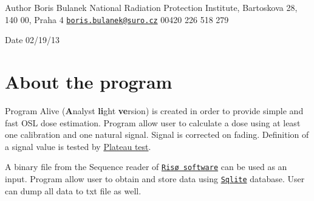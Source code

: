 \begin{DoxyAuthor}{Author}
Boris Bulanek  National Radiation Protection Institute, Bartoskova 28, 140 00, Praha 4  \href{mailto:boris.bulanek@suro.cz}{\tt boris.\-bulanek@suro.\-cz}  00420 226 518 279 
\end{DoxyAuthor}
\begin{DoxyDate}{Date}
02/19/13
\end{DoxyDate}
\hypertarget{index_about}{}\section{About the program}\label{index_about}
Program Alive ({\bfseries A}nalyst {\bfseries li}ght {\bfseries ve}rsion) is created in order to provide simple and fast O\-S\-L dose estimation. Program allow user to calculate a dose using at least one calibration and one natural signal. Signal is corrected on fading. Definition of a signal value is tested by \hyperlink{index_plateau_test}{Plateau test}.

A binary file from the Sequence reader of \href{http://www.nutech.dtu.dk/Produkter/Dosimetri/NUK_instruments/TL_OSL_readers.aspx?sc_lang=en}{\tt Risø software} can be used as an input. Program allow user to obtain and store data using \href{http://www.sqlite.org}{\tt Sqlite} database. User can dump all data to txt file as well.

